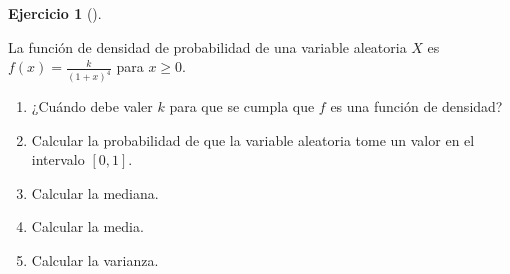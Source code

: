 \documentclass[
  spanish,
  a4paper,
]{scrreport}
\theoremstyle{definition}
\newtheorem{exercise}{Ejercicio}[chapter]
\theoremstyle{remark}
\begin{document}
\begin{exercise}[]\protect\hypertarget{exr-funcion-densidad}{}\label{exr-funcion-densidad}

La función de densidad de probabilidad de una variable aleatoria \(X\)
es \(f(x)=\frac{k}{(1+x)^4}\) para \(x\geq 0\).

\begin{enumerate}
\def\labelenumi{\alph{enumi}.}
\item
  ¿Cuándo debe valer \(k\) para que se cumpla que \(f\) es una función
  de densidad?
\item
  Calcular la probabilidad de que la variable aleatoria tome un valor en
  el intervalo \([0,1]\).
\item
  Calcular la mediana.
\item
  Calcular la media.
\item
  Calcular la varianza.
\end{enumerate}

\end{exercise}
\end{document}
